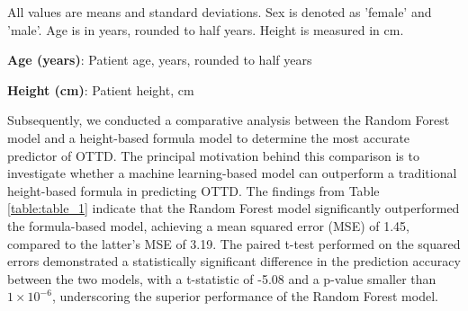 \documentclass[11pt]{article}
\begin{document}
\begin{table}[h]
\caption{Descriptive statistics of height and age stratified by sex}
\label{table:table_0}
\begin{threeparttable}
\renewcommand{\TPTminimum}{\linewidth}
\begin{tablenotes}
\footnotesize
\item All values are means and standard deviations. Sex is denoted as 'female' and 'male'. Age is in years, rounded to half years. Height is measured in cm.
\item \textbf{Age (years)}: Patient age, years, rounded to half years
\item \textbf{Height (cm)}: Patient height, cm
\end{tablenotes}
\end{threeparttable}
\end{table}


Subsequently, we conducted a comparative analysis between the Random Forest model and a height-based formula model to determine the most accurate predictor of OTTD. The principal motivation behind this comparison is to investigate whether a machine learning-based model can outperform a traditional height-based formula in predicting OTTD. The findings from Table {}\ref{table:table_1} indicate that the Random Forest model significantly outperformed the formula-based model, achieving a mean squared error (MSE) of 1.45, compared to the latter's MSE of 3.19. The paired t-test performed on the squared errors demonstrated a statistically significant difference in the prediction accuracy between the two models, with a t-statistic of -5.08 and a p-value smaller than $1 \times 10^{-6}$, underscoring the superior performance of the Random Forest model.
\end{document}
